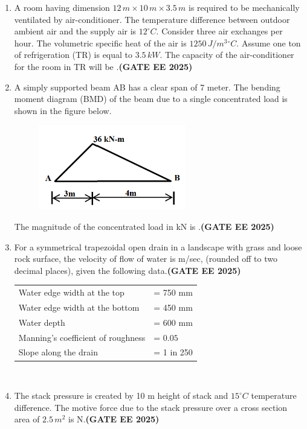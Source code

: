 \documentclass[journal,12pt,onecolumn]{IEEEtran}
\theoremstyle{remark}
\begin{document}
\begin{enumerate}
\item A room having dimension $12 \, m \times 10 \, m \times 3.5 \, m$ is required to be mechanically ventilated by air-conditioner. The temperature difference between outdoor ambient air and the supply air is $12^\circ C$. Consider three air exchanges per hour. The volumetric specific heat of the air is $1250 \, J/m^3{}^\circ C$. Assume one ton of refrigeration (TR) is equal to $3.5 \, kW$. The capacity of the air-conditioner for the room in TR will be \underline{\makebox[2cm]{\hfill}}.\hfill \textbf{(GATE EE 2025)} \\
\item A simply supported beam AB has a clear span of 7 meter. The bending moment diagram (BMD) of the beam due to a single concentrated load is shown in the figure below. \\
\begin{figure}[H]
    \centering
    \includegraphics[width=0.5\linewidth]{figs/fig5.png}
    \caption{}
    \label{fig5}
\end{figure}
The magnitude of the concentrated load in kN is \underline{\makebox[2cm]{\hfill}}.\hfill \textbf{(GATE EE 2025)} \\

\item For a symmetrical trapezoidal open drain in a landscape with grass and loose rock surface, the velocity of flow of water is \underline{\makebox[2cm]{\hfill}} m/sec, (rounded off to two decimal places), given the following data.\hfill \textbf{(GATE EE 2025)} \\

\begin{tabular}{ll}
Water edge width at the top &= 750 mm \\
Water edge width at the bottom &= 450 mm \\
Water depth &= 600 mm \\
Manning's coefficient of roughness &= $0.05$ \\
Slope along the drain &= 1 in 250 \\
\end{tabular} \\
\item The stack pressure is created by 10 m height of stack and $15^\circ C$ temperature difference. The motive force due to the stack pressure over a cross section area of $2.5 \, m^2$ is \underline{\makebox[2cm]{\hfill}} N.\hfill \textbf{(GATE EE 2025)} \\



\end{enumerate}
\end{document}
